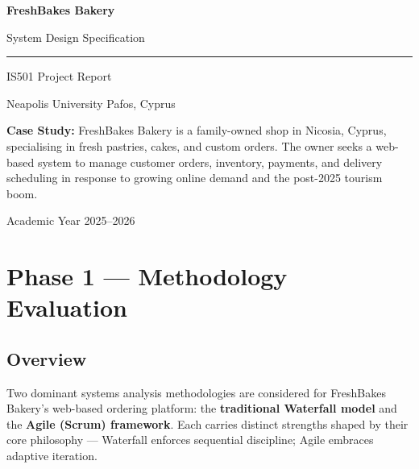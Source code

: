 \documentclass[12pt, a4paper]{report}
\begin{document}
\begin{titlepage}
  \centering
  \vspace*{2cm}
  {\Huge\bfseries\color{terracotta} FreshBakes Bakery\par}
  \vspace{0.5cm}
  {\Large System Design Specification\par}
  \vspace{1cm}
  \rule{0.6\textwidth}{0.4pt}\par
  \vspace{1cm}
  {\large IS501 Project Report\par}
  {\large Neapolis University Pafos, Cyprus\par}
  \vspace{2cm}
  \begin{mdframed}[linecolor=terracotta, backgroundcolor=lightcream!30,
                   innerleftmargin=16pt, innerrightmargin=16pt,
                   innertopmargin=12pt, innerbottommargin=12pt]
    \textbf{Case Study:} FreshBakes Bakery is a family-owned shop in Nicosia,
    Cyprus, specialising in fresh pastries, cakes, and custom orders. The owner
    seeks a web-based system to manage customer orders, inventory, payments,
    and delivery scheduling in response to growing online demand and the
    post-2025 tourism boom.
  \end{mdframed}
  \vfill
  {\small Academic Year 2025--2026}
\end{titlepage}

\tableofcontents
\newpage

\chapter{Phase 1 --- Methodology Evaluation}

\section{Overview}

Two dominant systems analysis methodologies are considered for FreshBakes
Bakery's web-based ordering platform: the \textbf{traditional Waterfall model}
and the \textbf{Agile (Scrum) framework}. Each carries distinct strengths
shaped by their core philosophy --- Waterfall enforces sequential discipline;
Agile embraces adaptive iteration.
\end{document}
